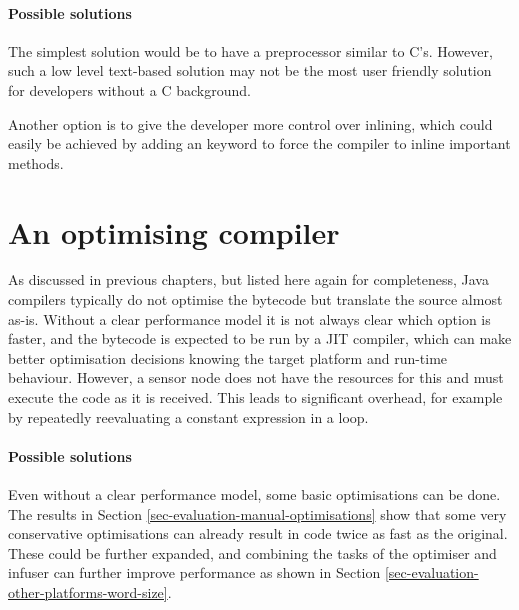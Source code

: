 \paragraph{Possible solutions}
The simplest solution would be to have a preprocessor similar to C's. However, such a low level text-based solution may not be the most user friendly solution for developers without a C background.

Another option is to give the developer more control over inlining, which could easily be achieved by adding an  keyword to force the compiler to inline important methods.





\section{An optimising compiler}
\label{sec-optimising-javac}
As discussed in previous chapters, but listed here again for completeness, Java compilers typically do not optimise the bytecode but translate the source almost as-is. Without a clear performance model it is not always clear which option is faster, and the bytecode is expected to be run by a JIT compiler, which can make better optimisation decisions knowing the target platform and run-time behaviour. However, a sensor node does not have the resources for this and must execute the code as it is received. This leads to significant overhead, for example by repeatedly reevaluating a constant expression in a loop.

\paragraph{Possible solutions}
Even without a clear performance model, some basic optimisations can be done. The results in Section \ref{sec-evaluation-manual-optimisations} show that some very conservative optimisations can already result in code twice as fast as the original. These could be further expanded, and combining the tasks of the optimiser and infuser can further improve performance as shown in Section \ref{sec-evaluation-other-platforms-word-size}.




